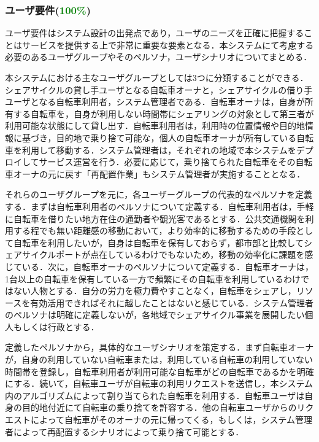       \subsubsection{ユーザ要件(\textcolor{green}{100\%})}
        \label{sec:ユーザ要件}
          \par ユーザ要件はシステム設計の出発点であり，ユーザのニーズを正確に把握することはサービスを提供する上で非常に重要な要素となる．本システムにて考慮する必要のあるユーザグループやそのペルソナ，ユーザシナリオについてまとめる．
          \par 本システムにおける主なユーザグループとしては3つに分類することができる．シェアサイクルの貸し手ユーザとなる自転車オーナと，シェアサイクルの借り手ユーザとなる自転車利用者，システム管理者である．自転車オーナは，自身が所有する自転車を，自身が利用しない時間帯にシェアリングの対象として第三者が利用可能な状態にして貸し出す．自転車利用者は，利用時の位置情報や目的地情報に基づき，目的地で乗り捨て可能な，個人の自転車オーナが所有している自転車を利用して移動する．システム管理者は，それぞれの地域で本システムをデプロイしてサービス運営を行う．必要に応じて，乗り捨てられた自転車をその自転車オーナの元に戻す「再配置作業」もシステム管理者が実施することとなる．
          \par それらのユーザグループを元に，各ユーザーグループの代表的なペルソナを定義する．まずは自転車利用者のペルソナについて定義する．自転車利用者は，手軽に自転車を借りたい地方在住の通勤者や観光客であるとする．公共交通機関を利用する程でも無い距離感の移動において，より効率的に移動するための手段として自転車を利用したいが，自身は自転車を保有しておらず，都市部と比較してシェアサイクルポートが点在しているわけでもないため，移動の効率化に課題を感じている．次に，自転車オーナのペルソナについて定義する．自転車オーナは，1台以上の自転車を保有している一方で頻繁にその自転車を利用しているわけではない人物とする．自分の労力を極力費やすことなく，自転車をシェアし，リソースを有効活用できればそれに越したことはないと感じている．システム管理者のペルソナは明確に定義しないが，各地域でシェアサイクル事業を展開したい個人もしくは行政とする．
          \par 定義したペルソナから，具体的なユーザシナリオを策定する．まず自転車オーナが，自身の利用していない自転車または，利用している自転車の利用していない時間帯を登録し，自転車利用者が利用可能な自転車がどの自転車であるかを明確にする．続いて，自転車ユーザが自転車の利用リクエストを送信し，本システム内のアルゴリズムによって割り当てられた自転車を利用する．自転車ユーザは自身の目的地付近にて自転車の乗り捨てを許容する．他の自転車ユーザからのリクエストによって自転車がそのオーナの元に帰ってくる，もしくは，システム管理者によって再配置するシナリオによって乗り捨て可能とする．
          
